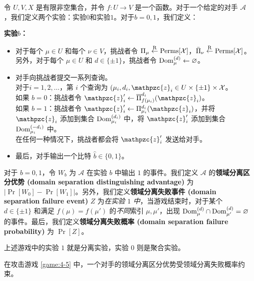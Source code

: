 \begin{game}[领域分离]\label{game:4-5}
令 $U,V,X$ 是有限非空集合，并令 $f:U\to V$ 是一个函数。对于一个给定的对手 $\mathcal{A}$，我们定义两个实验：实验$0$和实验$1$。对于$b=0,1$，我们定义：

\noindent\textbf{实验$b$：}
\begin{itemize}
	\item 对于每个 $\mu\in U$ 和每个 $\nu\in V$，挑战者令 $\Pi_\mu\overset{\rm R}\leftarrow{\rm Perms}[\mathcal{X}]$，$\bar\Pi_\nu\overset{\rm R}\leftarrow{\rm Perms}[\mathcal{X}]$。\\
	另外，对于每个 $\mu\in U$ 和 $d\in\{\pm1\}$，挑战者令 ${\rm Dom}^{(d)}_\mu\leftarrow\varnothing$。
	\item 对手向挑战者提交一系列查询。\\
	对于$i=1,2,\dots$，第 $i$ 个查询为 $(\mu_i,d_i,\mathpzc{z}_i\in U\times\{\pm1\}\times\mathcal{X}$。\\    
    如果 $b=0$：挑战者令 $\mathpzc{z}_i'\leftarrow\overline\Pi_{f(\mu_i)}^{d_i}(\mathpzc{z}_i)$。\\    
    如果 $b = 1$：挑战者令 $\mathpzc{z}_i'\leftarrow\Pi_{\mu_i}^{d_i}(\mathpzc{z}_i)$，并将 $\mathpzc{z}_i$ 添加到集合 ${\rm Dom}^{(d_i)}_{\mu_i}$ 中，将 $\mathpzc{z}_i'$ 添加到集合 ${\rm Dom}^{(-d_i)}_{\mu_i}$ 中。\\
    在任何一种情况下，挑战者都会将 $\mathpzc{z}_i'$ 发送给对手。
	\item 最后，对手输出一个比特 $\hat b\in\{0,1\}$。
\end{itemize}

对于 $b=0,1$，令 $W_b$ 为 $\mathcal{A}$ 在实验 $b$ 中输出 $1$ 的事件。我们定义 $\mathcal{A}$ 的\textbf{领域分离区分优势 (domain separation distinguishing advantage)} 为 $|\Pr[W_0]-\Pr[W_1]|$。另外，我们定义\textbf{领域分离失败事件 (domain separation failure event)} $Z$ 为\emph{在实验 $1$ 中}，当游戏结束时，对于某个 $d\in\{\pm1\}$ 和满足 $f(\mu)=f(\mu')$ 的\emph{不同}索引 $\mu,\mu'$，出现 ${\rm Dom}^{(d)}_{\mu}\cap{\rm Dom}^{(d)}_{\mu'}=\varnothing$ 的事件。最后，我们定义\textbf{领域分离失败概率 (domain separation failure probability)} 为 $\Pr[Z]$。
\end{game}

上述游戏中的实验 $1$ 就是分离实验，实验 $0$ 则是聚合实验。

\begin{theorem}[领域分离引理]\label{theo:4-15}
在攻击游戏 \ref{game:4-5} 中，一个对手的领域分离区分优势受领域分离失败概率约束。
\end{theorem}

